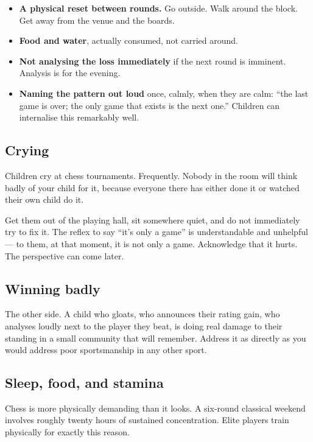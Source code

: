 \documentclass[10pt,letterpaper]{article}
\begin{document}
\begin{itemize}
  \item \textbf{A physical reset between rounds.} Go outside. Walk around the
        block. Get away from the venue and the boards.
  \item \textbf{Food and water}, actually consumed, not carried around.
  \item \textbf{Not analysing the loss immediately} if the next round is
        imminent. Analysis is for the evening.
  \item \textbf{Naming the pattern out loud} once, calmly, when they are calm:
        ``the last game is over; the only game that exists is the next one.''
        Children can internalise this remarkably well.
\end{itemize}

\subsection{Crying}

Children cry at chess tournaments. Frequently. Nobody in the room will think
badly of your child for it, because everyone there has either done it or
watched their own child do it.

Get them out of the playing hall, sit somewhere quiet, and do not immediately
try to fix it. The reflex to say ``it's only a game'' is understandable and
unhelpful --- to them, at that moment, it is not only a game. Acknowledge that it
hurts. The perspective can come later.

\subsection{Winning badly}

The other side. A child who gloats, who announces their rating gain, who
analyses loudly next to the player they beat, is doing real damage to their
standing in a small community that will remember. Address it as directly as you
would address poor sportsmanship in any other sport.

\subsection{Sleep, food, and stamina}

Chess is more physically demanding than it looks. A six-round classical weekend
involves roughly twenty hours of sustained concentration. Elite players train
physically for exactly this reason.
\end{document}
